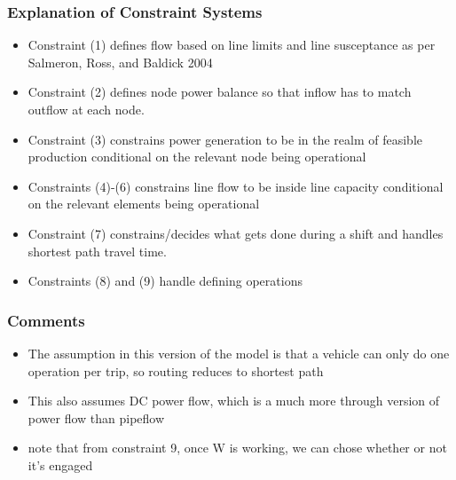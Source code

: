 \documentclass{article}
\begin{document}
	\subsubsection{Explanation of Constraint Systems}
	\begin{itemize}
		\item Constraint (1) defines flow based on line limits and line susceptance as per Salmeron, Ross, and Baldick 2004
		\item Constraint (2) defines node power balance so that inflow has to match outflow at each node.
		\item Constraint (3) constrains power generation to be in the realm of feasible production conditional on the relevant node being operational
		\item Constraints (4)-(6) constrains line flow to be inside line capacity conditional on the relevant elements being operational
		\item Constraint (7) constrains/decides what gets done during a shift and handles shortest path travel time.
		\item Constraints (8) and (9) handle defining operations
	\end{itemize}
	\subsubsection{Comments}
	\begin{itemize}
		\item The assumption in this version of the model is that a vehicle can only do one operation per trip, so routing reduces to shortest path
		\item This also assumes DC power flow, which is a much more through version of power flow than pipeflow
		\item note that from constraint 9, once W is working, we can chose whether or not it's engaged
	\end{itemize}
		
\end{document}
